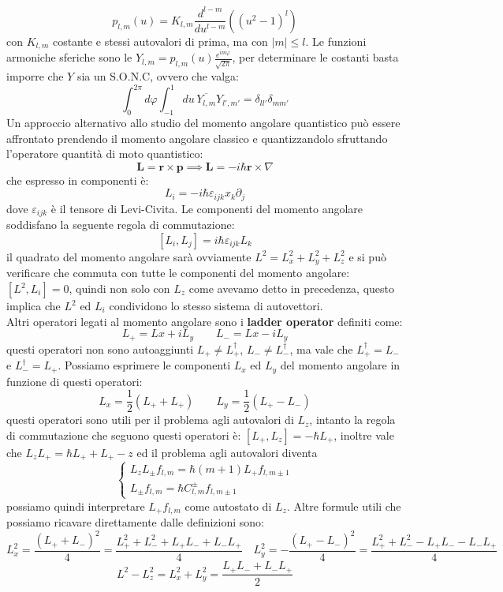 \[p_{l,m}(u) = K_{l,m}\frac{d^{l-m}}{du^{l-m}}\left((u^2-1)^l\right)\]
con $K_{l,m}$ costante e stessi autovalori di prima, ma con $|m|\leq l$. Le funzioni armoniche sferiche sono le $Y_{l,m} = p_{l,m}(u)\frac{e^{im\varphi}}{\sqrt{2\pi}} $, per determinare le costanti basta imporre che $Y$ sia un S.O.N.C, ovvero che valga:
\[\int_0^{2\pi}d\varphi\int_{-1}^1du\, \overline{Y_{l,m}}Y_{l',m'} = \delta_{ll'}\delta_{mm'}\]
Un approccio alternativo allo studio del momento angolare quantistico può essere affrontato prendendo il momento angolare classico e quantizzandolo sfruttando l'operatore quantità di moto quantistico:
\[\mathbf{L} = \mathbf{r}\times \mathbf{p} \implies \mathbf{L} = -i\hbar\mathbf{r}\times \nabla \]
che espresso in componenti è:
\[L_i = -i\hbar \varepsilon_{ijk}x_k\partial_j\]
dove $\varepsilon_{ijk}$ è il tensore di Levi-Civita. Le componenti del momento angolare soddisfano la seguente regola di commutazione:
\[[L_i,L_j] = i\hbar \varepsilon_{ijk}L_k\]
il quadrato del momento angolare sarà ovviamente $L^2 = L_x^2+L_y^2 + L_z^2$ e si può verificare che commuta con tutte le componenti del momento angolare: $[L^2,L_i]=0$, quindi non solo con $L_z$ come avevamo detto in precedenza, questo implica che $L^2$ ed $L_i$ condividono lo stesso sistema di autovettori.\\
Altri operatori legati al momento angolare sono i \textbf{ladder operator} definiti come:
\[L_+ = Lx + iL_y \qquad L_- = Lx-iL_y\]
questi operatori non sono autoaggiunti $L_+\neq L_+^\dagger$, $L_-\neq L_-^\dagger$, ma vale che $L_+^\dagger = L_-$ e $L_-^\dagger = L_+$. Possiamo esprimere le componenti $L_x$ ed $L_y$ del momento angolare in funzione di questi operatori:
\[L_x = \frac{1}{2}(L_+ +L_+) \qquad L_y = \frac{1}{2}(L_+-L_-)\] 
questi operatori sono utili per il problema agli autovalori di $L_z$, intanto la regola di commutazione che seguono questi operatori è: $[L_+,L_z] = -\hbar L_+$, inoltre vale che $L_zL_+ = \hbar L_+ +  L_+-z$ ed il problema agli autovalori diventa 
\[\begin{cases}
L_zL_\pm f_{l,m} = \hbar(m+1)L_+ f_{l,m\pm1}\\
L_\pm f_{l,m} = \hbar C^{\pm}_{l,m}f_{l,m\pm1}
\end{cases}
\]
possiamo quindi interpretare $L_+f_{l,m}$ come autostato di $L_z$. Altre formule utili che possiamo ricavare direttamente dalle definizioni sono:
\[L_x^2 = \frac{(L_++L_-)^2}{4} = \frac{L_+^2 + L_-^2 + L_+L_- + L_-L_+}{4}\quad L_y^2 = -\frac{(L_+-L_-)^2}{4} = \frac{L_+^2 + L_-^2 - L_+L_- - L_-L_+}{4}\]
\[L^2-L_z^2 = L_x^2 + L_y^2 = \frac{L_+L_- + L_-L_+}{2}\]
